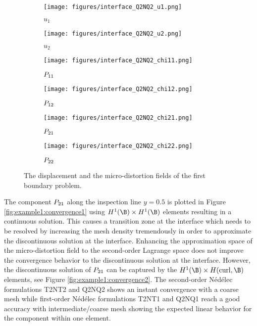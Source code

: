 \begin{figure}[ht]
     \centering
     \begin{subfigure}[b]{0.45\textwidth}
         \centering
         \texttt{[image: figures/interface\_Q2NQ2\_u1.png]}
			\caption{$u_1$}
     \end{subfigure}
     \centering
     \begin{subfigure}[b]{0.45\textwidth}
         \centering
         \texttt{[image: figures/interface\_Q2NQ2\_u2.png]}
			\caption{$u_2$}
     \end{subfigure}
     \begin{subfigure}[b]{0.45\textwidth}
         \centering
         \texttt{[image: figures/interface\_Q2NQ2\_chi11.png]}
			\caption{$P_{11}$}
     \end{subfigure}
     \begin{subfigure}[b]{0.45\textwidth}
         \centering
         \texttt{[image: figures/interface\_Q2NQ2\_chi12.png]}
			\caption{$P_{12}$}
     \end{subfigure}
     \begin{subfigure}[b]{0.45\textwidth}
         \centering
         \texttt{[image: figures/interface\_Q2NQ2\_chi21.png]}
			\caption{$P_{21}$}
     \end{subfigure}
     \begin{subfigure}[b]{0.45\textwidth}
         \centering
         \texttt{[image: figures/interface\_Q2NQ2\_chi22.png]}
			\caption{$P_{22}$}
     \end{subfigure}
        \caption{The displacement and the micro-distortion fields of the first boundary problem.}
\label{fig:example1:solution}
\end{figure}

The component  $P_{21}$ along the inspection line $y=0.5$ is plotted in Figure \ref{fig:example1:convergence1}   using $H^1(\B) \times H^1(\B)$ elements  resulting in a continuous solution. This causes a transition zone at the interface which needs to be resolved by increasing the mesh density tremendously in order to approximate the discontinuous solution at the interface. Enhancing the approximation space of the micro-distortion field to the second-order Lagrange space does not improve the convergence behavior to the discontinuous  solution at the interface. However, the discontinuous solution of $P_{21}$ can be captured by the $H^1(\B) \times H(\curl, \B)$ elements, see Figure \ref{fig:example1:convergence2}. The second-order N\'ed\'elec formulations T2NT2 and Q2NQ2 shows an instant convergence with a coarse mesh while first-order N\'ed\'elec formulations T2NT1 and Q2NQ1 reach a good accuracy with intermediate/coarse mesh showing the expected linear behavior for the component within one element. 

